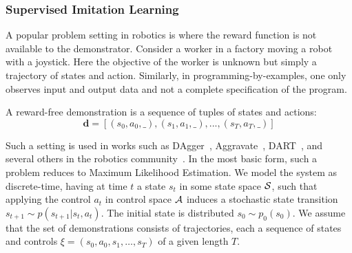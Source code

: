 \subsubsection{Supervised Imitation Learning}
A popular problem setting in robotics is where the reward function is not available to the demonstrator. Consider a worker in a factory moving a robot with a joystick. Here the objective of the worker is unknown but simply a trajectory of states and action. Similarly, in programming-by-examples, one only observes input and output data and not a complete specification of the program.

\begin{definition}
A reward-free demonstration is a sequence of tuples of states and actions:
\[\mathbf{d} = [(s_0,a_0,\_),(s_1,a_1,\_),...,(s_T,a_T,\_)]\]
\end{definition}

Such a setting is used in works such as DAgger~\cite{ross2011reduction}, Aggravate~\cite{sun2017deeply}, DART~\cite{laskey2017iterative}, and  several others in the robotics community~\cite{osa2018algorithmic}. In the most basic form, such a problem reduces to Maximum Likelihood Estimation. We model the system as discrete-time, having at time $t$ a state $s_t$ in some state space $\mathcal{S}$, such that applying the control $a_t$ in control space $\mathcal{A}$ induces a stochastic state transition $s_{t+1}\sim p(s_{t+1}|s_t,a_t)$. The initial state is distributed $s_0\sim p_0(s_0)$. We assume that the set of demonstrations consists of trajectories, each a sequence of states and controls $\xi = (s_0, a_0, s_1, \ldots, s_T)$ of a given length $T$.

